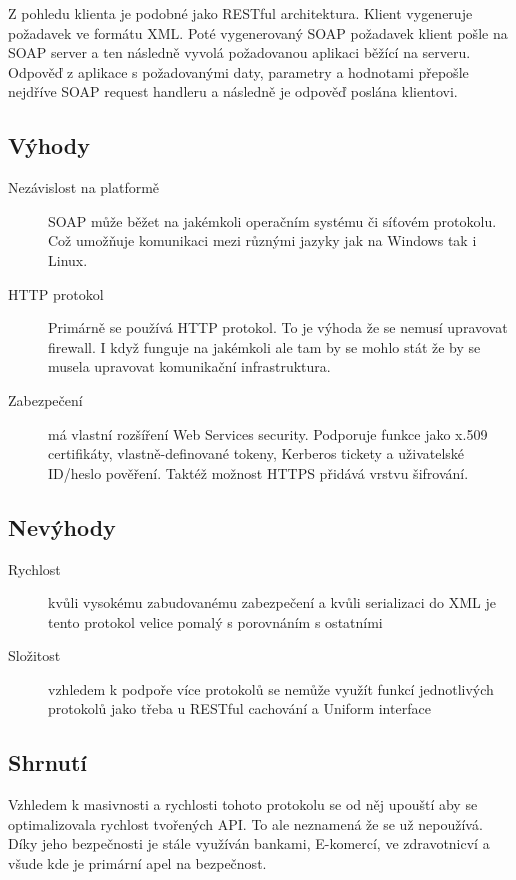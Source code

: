 Z pohledu klienta je podobné jako RESTful architektura. Klient vygeneruje požadavek ve formátu XML. Poté vygenerovaný SOAP požadavek klient pošle na SOAP server a ten následně vyvolá požadovanou aplikaci běžící na serveru. Odpověď z aplikace s požadovanými daty, parametry a hodnotami přepošle nejdříve SOAP request handleru a následně je odpověď poslána klientovi.

\subsection{Výhody}
\begin{description}
    \item[Nezávislost na platformě] SOAP může běžet na jakémkoli operačním systému či síťovém protokolu. Což umožňuje komunikaci mezi různými jazyky jak na Windows tak i Linux.
    \item[HTTP protokol] Primárně se používá HTTP protokol. To je výhoda že se nemusí upravovat firewall. I když funguje na jakémkoli ale tam by se mohlo stát že by se musela upravovat komunikační infrastruktura.
    \item[Zabezpečení] má vlastní rozšíření Web Services security. Podporuje funkce jako x.509 certifikáty, vlastně-definované tokeny, Kerberos tickety a uživatelské ID/heslo pověření. Taktéž možnost HTTPS přidává vrstvu šifrování.
\end{description}

\subsection{Nevýhody}
\begin{description}
    \item[Rychlost] kvůli vysokému zabudovanému zabezpečení a kvůli serializaci do XML je tento protokol velice pomalý s porovnáním s ostatními
    \item[Složitost] vzhledem k podpoře více protokolů se nemůže využít funkcí jednotlivých protokolů jako třeba u RESTful cachování a Uniform interface
\end{description}

\subsection{Shrnutí}
Vzhledem k masivnosti a rychlosti tohoto protokolu se od něj upouští aby se optimalizovala rychlost tvořených API. To ale neznamená že se už nepoužívá. Díky jeho bezpečnosti je stále využíván bankami, E-komercí, ve zdravotnicví a všude kde je primární apel na bezpečnost.

